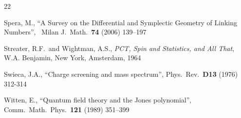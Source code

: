 \documentclass[11pt]{article}
\numberwithin{equation}{section}
\begin{document}
\begin{thebibliography}{22}
{ Spera, M.,
``A Survey on the Differential and Symplectic Geometry of Linking Numbers'', \ 
Milan J.\ Math.\ {\bf 74} (2006) 139--197

  Streater, R.F.\ and Wightman, A.S., 
{\it PCT, Spin and Statistics, and All That},
W.A. Benjamin, New York, Amsterdam, 1964

 Swieca, J.A.,
``Charge  screening  and  mass  spectrum'',  
Phys.\  Rev.\ {\bf D13} (1976) 312-314

 Witten, E.,
``Quantum field theory and the Jones polynomial'',
Comm.\ Math.\ Phys.\ {\bf 121} (1989) 351--399

}
\end{thebibliography}
\end{document}
